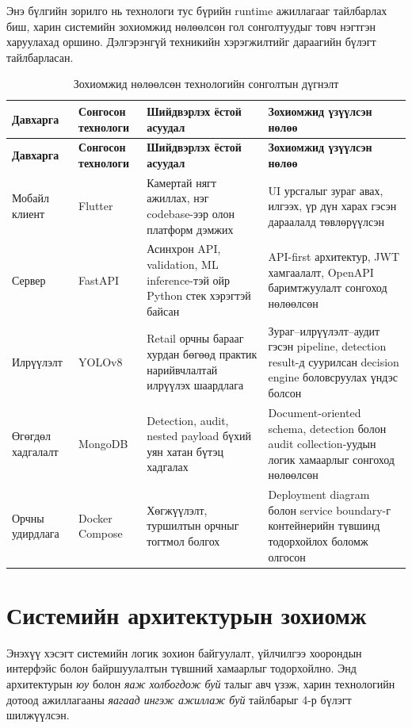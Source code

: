 Энэ бүлгийн зорилго нь технологи тус бүрийн runtime ажиллагааг тайлбарлах биш, харин системийн зохиомжид нөлөөлсөн гол сонголтуудыг товч нэгтгэн харуулахад оршино. Дэлгэрэнгүй техникийн хэрэгжилтийг дараагийн бүлэгт тайлбарласан.

\begin{longtable}{|p{2.7cm}|p{2.9cm}|p{3.9cm}|p{3.9cm}|}
\caption{Зохиомжид нөлөөлсөн технологийн сонголтын дүгнэлт}
\label{tab:technology_selection_summary} \\
\hline
\textbf{Давхарга} & \textbf{Сонгосон технологи} & \textbf{Шийдвэрлэх ёстой асуудал} & \textbf{Зохиомжид үзүүлсэн нөлөө} \\
\hline
\endfirsthead
\hline
\textbf{Давхарга} & \textbf{Сонгосон технологи} & \textbf{Шийдвэрлэх ёстой асуудал} & \textbf{Зохиомжид үзүүлсэн нөлөө} \\
\hline
\endhead
\hline
\endfoot
Мобайл клиент & Flutter & Камертай нягт ажиллах, нэг codebase-ээр олон платформ дэмжих & UI урсгалыг зураг авах, илгээх, үр дүн харах гэсэн дараалалд төвлөрүүлсэн \\
\hline
Сервер & FastAPI & Асинхрон API, validation, ML inference-тэй ойр Python стек хэрэгтэй байсан & API-first архитектур, JWT хамгаалалт, OpenAPI баримтжуулалт сонгоход нөлөөлсөн \\
\hline
Илрүүлэлт & YOLOv8 & Retail орчны барааг хурдан бөгөөд практик нарийвчлалтай илрүүлэх шаардлага & Зураг--илрүүлэлт--аудит гэсэн pipeline, detection result-д суурилсан decision engine боловсруулах үндэс болсон \\
\hline
Өгөгдөл хадгалалт & MongoDB & Detection, audit, nested payload бүхий уян хатан бүтэц хадгалах & Document-oriented schema, detection болон audit collection-уудын логик хамаарлыг сонгоход нөлөөлсөн \\
\hline
Орчны удирдлага & Docker Compose & Хөгжүүлэлт, туршилтын орчныг тогтмол болгох & Deployment diagram болон service boundary-г контейнерийн түвшинд тодорхойлох боломж олгосон \\
\hline
\end{longtable}

\section{Системийн архитектурын зохиомж}

Энэхүү хэсэгт системийн логик зохион байгуулалт, үйлчилгээ хоорондын интерфэйс болон байршуулалтын түвшний хамаарлыг тодорхойлно. Энд архитектурын \textit{юу} болон \textit{яаж холбогдож буй} талыг авч үзэж, харин технологийн дотоод ажиллагааны \textit{яагаад ингэж ажиллаж буй} тайлбарыг 4-р бүлэгт шилжүүлсэн.

